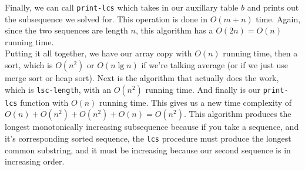 \documentclass[11pt]{article}
\begin{document}
 Finally, we can call \texttt{print-lcs} which takes in our auxillary table $b$ and prints 
 out the subsequence we solved for.  This operation is done in $O(m+n)$ time.  Again, since 
 the two sequences are length $n$, this algorithm has a $O(2n) = O(n)$ running time. \\

 Putting it all together, we have our array copy with $O(n)$ running time, then a sort, 
 which is $O(n^2)$ or $O(n \lg n)$ if we're talking average (or if we just use merge sort or 
 heap sort).  Next is the algorithm that actually does the work, which is \texttt{lsc-length}, 
 with an $O(n^2)$ running time.  And finally is our \texttt{print-lcs} function with $O(n)$ 
 running time.  This gives us a new time complexity of $O(n) + O(n^2) + O(n^2) + O(n) = O(n^2)$.
 This algorithm produces the longest monotonically increasing subsequence because if you take 
 a sequence, and it's corresponding sorted sequence, the \texttt{lcs} procedure must produce the 
 longest common substring, and it must be increasing because our second sequence is in increasing 
 order.
 \newpage
\end{document}
